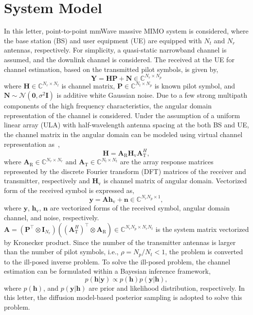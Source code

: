 \documentclass[lettersize,journal]{IEEEtran}
\begin{document}
\section{System Model}

In this letter, point-to-point mmWave massive MIMO system is considered, where the base station (BS) and user equipment (UE) are equipped with $N_{t}$ and $N_{r}$ antennas, respectively. For simplicity, a quasi-static narrowband channel is assumed, and the downlink channel is considered. The received at the UE for channel estimation, based on the transmitted pilot symbols, is given by,
\begin{equation}
\mathbf{Y}=\mathbf{H}\mathbf{P}+\mathbf{N}\in \mathbb{C}^{N_{r}\times N_{p}}
\end{equation}
where $\mathbf{H}\in \mathbb{C}^{N_{r}\times N_{t}}$ is channel matrix, $\mathbf{P}\in \mathbb{C}^{N_{t}\times N_{p}}$ is known pilot symbol, and $\mathbf{N}\sim\mathcal{N}(\mathbf{0},\sigma^{2}\mathbf{I})$ is additive white Gaussian noise. Due to a few strong multipath components of the high frequency characteristics, the angular domain representation of the channel is considered. Under the assumption of a uniform linear array (ULA) with half-wavelength antenna spacing at the both BS and UE, the channel matrix in the angular domain can be modeled using virtual channel representation as~\cite{sayeedDeconstructingMultiantennaFading2002},
\begin{equation}
\mathbf{H} = \mathbf{A}_{\text{R}}\mathbf{H}_{\text{v}}\mathbf{A}_{\text{T}}^{H},
\end{equation}
where $\mathbf{A}_{\text{R}}\in \mathbb{C}^{N_{r}\times N_{r}}$ and $\mathbf{A}_{\text{T}}\in \mathbb{C}^{N_{t}\times N_{t}}$ are the array response matrices represented by the discrete Fourier transform (DFT) matrices of the receiver and transmitter, respectively and $\mathbf{H}_{\text{v}}$ is channel matrix of angular domain.
Vectorized form of the received symbol is expressed as,
\begin{equation}
\mathbf{y} = \mathbf{A}\mathbf{h}_{\text{v}}+\mathbf{n}\in \mathbb{C}^{N_{r}N_{p}\times 1},
\end{equation}
where $\mathbf{y}$, $\mathbf{h}_{\text{v}}$, $\mathbf{n}$ are vectorized forms of the received symbol, angular domain channel, and noise, respectively. $\mathbf{A}=(\mathbf{P}^{\top}\otimes\mathbf{I}_{N_{r}})((\mathbf{A}_{\text{T}}^{H})^{\top}\otimes \mathbf{A}_{\text{R}})\in \mathbb{C}^{N_{r}N_{p}\times N_{r}N_{t}}$ is the system matrix vectorized by Kronecker product.
Since the number of the transmitter antennas is larger than the number of pilot symbols, i.e., $\rho=N_{p}/N_{t}<1$, the problem is converted to the ill-posed inverse problem.
To solve the ill-posed problem, the channel estimation can be formulated within a Bayesian inference framework,
\begin{equation}
  p(\mathbf{h}|\mathbf{y})\propto p(\mathbf{h})p(\mathbf{y}|\mathbf{h}),
\end{equation}
where $p(\mathbf{h})$, and $p(\mathbf{y}|\mathbf{h})$ are prior and likelihood distribution, respectively. In this letter, the diffusion model-based posterior sampling is adopted to solve this problem.
\end{document}
